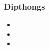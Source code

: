 \documentclass[main.tex]{subfiles}
\begin{document}
\subsubsection{Dipthongs}
\begin{multicols}{5}
    \begin{itemize}
        \item {}
        \item {}
        \item {}
    \end{itemize}
\end{multicols}
\end{document}
